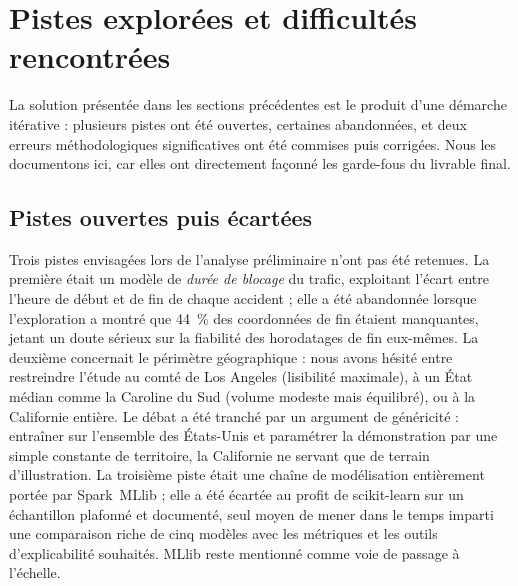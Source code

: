 
\section{Pistes explorées et difficultés rencontrées}

La solution présentée dans les sections précédentes est le produit d'une
démarche itérative : plusieurs pistes ont été ouvertes, certaines abandonnées,
et deux erreurs méthodologiques significatives ont été commises puis corrigées.
Nous les documentons ici, car elles ont directement façonné les garde-fous du
livrable final.

\subsection{Pistes ouvertes puis écartées}

Trois pistes envisagées lors de l'analyse préliminaire n'ont pas été retenues.
La première était un modèle de \emph{durée de blocage} du trafic, exploitant
l'écart entre l'heure de début et de fin de chaque accident ; elle a été
abandonnée lorsque l'exploration a montré que 44~\% des coordonnées de fin
étaient manquantes, jetant un doute sérieux sur la fiabilité des horodatages
de fin eux-mêmes. La deuxième concernait le périmètre géographique : nous
avons hésité entre restreindre l'étude au comté de Los Angeles (lisibilité
maximale), à un État médian comme la Caroline du Sud (volume modeste mais
équilibré), ou à la Californie entière. Le débat a été tranché par un
argument de généricité : entraîner sur l'ensemble des États-Unis et
paramétrer la démonstration par une simple constante de territoire, la
Californie ne servant que de terrain d'illustration. La troisième piste était
une chaîne de modélisation entièrement portée par Spark~MLlib ; elle a été
écartée au profit de scikit-learn sur un échantillon plafonné et documenté,
seul moyen de mener dans le temps imparti une comparaison riche de cinq
modèles avec les métriques et les outils d'explicabilité souhaités. MLlib
reste mentionné comme voie de passage à l'échelle.

